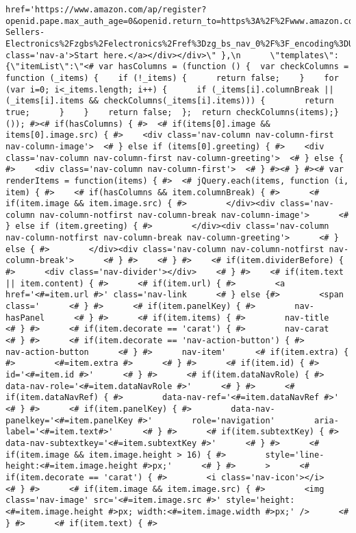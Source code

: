 \documentclass[
]{article}
\begin{document}
\begin{verbatim}
href='https://www.amazon.com/ap/register?openid.pape.max_auth_age=0&openid.return_to=https%3A%2F%2Fwww.amazon.com%2FBest-Sellers-Electronics%2Fzgbs%2Felectronics%2Fref%3Dzg_bs_nav_0%2F%3F_encoding%3DUTF8%26ref_%3Dnav_custrec_newcust&openid.identity=http%3A%2F%2Fspecs.openid.net%2Fauth%2F2.0%2Fidentifier_select&openid.assoc_handle=usflex&openid.mode=checkid_setup&openid.claimed_id=http%3A%2F%2Fspecs.openid.net%2Fauth%2F2.0%2Fidentifier_select&openid.ns=http%3A%2F%2Fspecs.openid.net%2Fauth%2F2.0&' class='nav-a'>Start here.</a></div></div>\" },\n      \"templates\": {\"itemList\":\"<# var hasColumns = (function () {  var checkColumns = function (_items) {    if (!_items) {      return false;    }    for (var i=0; i<_items.length; i++) {      if (_items[i].columnBreak || (_items[i].items && checkColumns(_items[i].items))) {        return true;      }    }    return false;  };  return checkColumns(items);}()); #><# if(hasColumns) { #>  <# if(items[0].image && items[0].image.src) { #>    <div class='nav-column nav-column-first nav-column-image'>  <# } else if (items[0].greeting) { #>    <div class='nav-column nav-column-first nav-column-greeting'>  <# } else { #>    <div class='nav-column nav-column-first'>  <# } #><# } #><# var renderItems = function(items) { #>  <# jQuery.each(items, function (i, item) { #>    <# if(hasColumns && item.columnBreak) { #>      <# if(item.image && item.image.src) { #>        </div><div class='nav-column nav-column-notfirst nav-column-break nav-column-image'>      <# } else if (item.greeting) { #>        </div><div class='nav-column nav-column-notfirst nav-column-break nav-column-greeting'>      <# } else { #>        </div><div class='nav-column nav-column-notfirst nav-column-break'>      <# } #>    <# } #>    <# if(item.dividerBefore) { #>      <div class='nav-divider'></div>    <# } #>    <# if(item.text || item.content) { #>      <# if(item.url) { #>        <a href='<#=item.url #>' class='nav-link      <# } else {#>        <span class='      <# } #>      <# if(item.panelKey) { #>        nav-hasPanel      <# } #>      <# if(item.items) { #>        nav-title      <# } #>      <# if(item.decorate == 'carat') { #>        nav-carat      <# } #>      <# if(item.decorate == 'nav-action-button') { #>        nav-action-button      <# } #>      nav-item'      <# if(item.extra) { #>        <#=item.extra #>      <# } #>      <# if(item.id) { #>        id='<#=item.id #>'      <# } #>      <# if(item.dataNavRole) { #>        data-nav-role='<#=item.dataNavRole #>'      <# } #>      <# if(item.dataNavRef) { #>        data-nav-ref='<#=item.dataNavRef #>'      <# } #>      <# if(item.panelKey) { #>        data-nav-panelkey='<#=item.panelKey #>'        role='navigation'        aria-label='<#=item.text#>'      <# } #>      <# if(item.subtextKey) { #>        data-nav-subtextkey='<#=item.subtextKey #>'      <# } #>      <# if(item.image && item.image.height > 16) { #>        style='line-height:<#=item.image.height #>px;'      <# } #>      >      <# if(item.decorate == 'carat') { #>        <i class='nav-icon'></i>      <# } #>      <# if(item.image && item.image.src) { #>        <img class='nav-image' src='<#=item.image.src #>' style='height:<#=item.image.height #>px; width:<#=item.image.width #>px;' />      <# } #>      <# if(item.text) { #>        
\end{verbatim}
\end{document}
